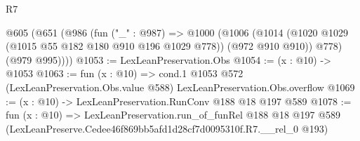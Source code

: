 \begin{lexlean}{R7}
\begin{coremodule}
  @605
    (@651
      (@986
        (fun ("_" : @987) =>
        @1000
          (@1006
            (@1014 (@1020 @1029 (@1015 @55 @182 @180 @910 @196 @1029 @778)) (@972 @910 @910))
            @778)
          (@979 @995))))
@1053 := LexLeanPreservation.Obs
@1054 := (x : @10) -> @1053
@1063 := fun (x : @10) =>
  cond.{1} @1053 @572 (LexLeanPreservation.Obs.value @588) LexLeanPreservation.Obs.overflow
@1069 := (x : @10) -> LexLeanPreservation.RunConv @188 @18 @197 @589
@1078 := fun (x : @10) =>
  LexLeanPreservation.run_of_funRel
    @188
    @18
    @197
    @589
    (LexLeanPreserve.Cedee46f869bb5afd1d28cf7d0095310f.R7.__rel_0 @193)
\end{coremodule}
\end{lexlean}
